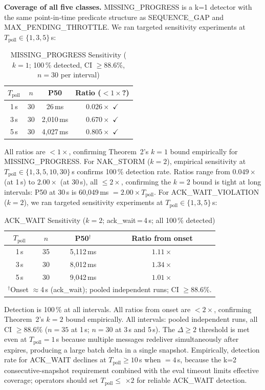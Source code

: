 \documentclass[sigconf,nonacm]{acmart}
\begin{document}
\textbf{Coverage of all five classes.}
MISSING\_\allowbreak PROGRESS is a k=1 detector with the same
point-in-time predicate structure as SEQUENCE\_GAP and
MAX\_PENDING\_\allowbreak THROTTLE. We ran targeted sensitivity
experiments at $T_\mathrm{poll} \in \{1,3,5\}$\,s:
\begin{table}[h]
\centering
\caption{MISSING\_PROGRESS Sensitivity ($k{=}1$; 100\,\% detected, CI $\geq 88.6\%$, $n{=}30$ per interval)}
\label{tab:missing_sens}
\small\begin{tabular}{cccc}
\toprule
$T_\mathrm{poll}$ & $n$ & P50 & Ratio ($<1\times$?) \\
\midrule
1\,s & 30 &       26\,ms & $0.026\times$ $\checkmark$ \\
3\,s & 30 & 2{,}010\,ms  & $0.670\times$ $\checkmark$ \\
5\,s & 30 & 4{,}027\,ms  & $0.805\times$ $\checkmark$ \\
\bottomrule
\end{tabular}
\end{table}
All ratios are $<1\times$, confirming Theorem~2's $k{=}1$ bound
empirically for MISSING\_\allowbreak PROGRESS.
For NAK\_STORM ($k{=}2$), empirical sensitivity at
$T_\mathrm{poll} \in \{1,3,5,10,30\}$\,s confirms 100\,\% detection rate.
Ratios range from $0.049\times$ (at 1\,s) to $2.00\times$ (at 30\,s),
all $\leq 2\times$, confirming the $k{=}2$ bound is tight at long intervals:
P50 at 30\,s is 60{,}049\,ms $= 2.00\times T_\mathrm{poll}$.
For ACK\_WAIT\_\allowbreak VIOLATION ($k{=}2$), we ran targeted
sensitivity experiments at $T_\mathrm{poll} \in \{1,3,5\}$\,s:
\begin{table}[h]
\centering
\caption{ACK\_WAIT Sensitivity ($k{=}2$; ack\_wait\,=\,4\,s; all 100\,\% detected)}
\label{tab:ackwait_sens}
\small\begin{tabular}{cccc}
\toprule
$T_\mathrm{poll}$ & $n$ & P50$^\dagger$ & Ratio from onset \\
\midrule
1\,s &  35 & 5{,}112\,ms & $1.11\times$ \\
3\,s &  30 & 8{,}012\,ms & $1.34\times$ \\
5\,s &  30 & 9{,}042\,ms & $1.01\times$ \\
\multicolumn{4}{l}{\small $^\dagger$Onset $\approx$4\,s (ack\_wait); pooled independent runs; CI $\geq 88.6\%$.} \\
\bottomrule
\end{tabular}
\end{table}
Detection is 100\,\% at all intervals.
All ratios from onset are $<2\times$,
confirming Theorem~2's $k{=}2$ bound empirically.
All intervals: pooled independent runs, all CI $\geq 88.6\%$
($n{=}35$ at 1\,s; $n{=}30$ at 3\,s and 5\,s).
The $\Delta$${}\geq 2$ threshold is met even at
$T_\mathrm{poll}{=}1$\,s because multiple messages redeliver
simultaneously after  expires, producing a large batch
delta in a single snapshot.
Empirically, detection rate for ACK\_WAIT declines at
$T_\mathrm{poll} \geq 10$\,s when $=4$\,s, because the
k=2 consecutive-snapshot requirement combined with the eval timeout limits
effective coverage; operators should set $T_\mathrm{poll} \leq$
$\times 2$ for reliable ACK\_WAIT detection.
\end{document}
